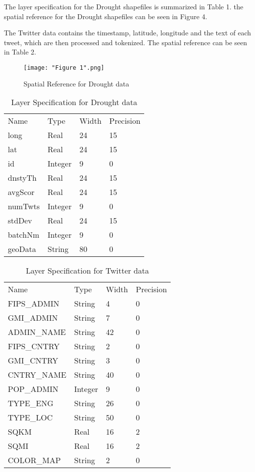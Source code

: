 \documentclass[conference]{IEEEtran}
\begin{document}
The layer specification for the Drought shapefiles is summarized in Table 1. the spatial reference for the Drought shapefiles can be seen in Figure 4.

The Twitter data contains the timestamp, latitude, longitude and the text of each tweet, which are then processed and tokenized. The spatial reference can be seen in Table 2.

\begin{figure}[ht]
\centerline{\texttt{[image: "Figure 1".png]}}
\caption{Spatial Reference for Drought data}
\label{Figure 4}
\end{figure}


\begin{table}[]
\caption{Layer Specification for Drought data}
\label{Table 1}
\centering
\begin{tabular}{llll}
Name    & Type    & Width & Precision \\
long    & Real    & 24    & 15        \\
lat     & Real    & 24    & 15        \\
id      & Integer & 9     & 0         \\
dnstyTh & Real    & 24    & 15        \\
avgScor & Real    & 24    & 15        \\
numTwts & Integer & 9     & 0         \\
stdDev  & Real    & 24    & 15        \\
batchNm & Integer & 9     & 0         \\
geoData & String  & 80    & 0        
\end{tabular}
\end{table}

\begin{table}[]
\caption{Layer Specification for Twitter data}
\label{Table 2}
\centering
\begin{tabular}{llll}
Name        & Type    & Width & Precision \\
FIPS\_ADMIN & String  & 4     & 0         \\
GMI\_ADMIN  & String  & 7     & 0         \\
ADMIN\_NAME & String  & 42    & 0         \\
FIPS\_CNTRY & String  & 2     & 0         \\
GMI\_CNTRY  & String  & 3     & 0         \\
CNTRY\_NAME & String  & 40    & 0         \\
POP\_ADMIN  & Integer & 9     & 0         \\
TYPE\_ENG   & String  & 26    & 0         \\
TYPE\_LOC   & String  & 50    & 0         \\
SQKM        & Real    & 16    & 2         \\
SQMI        & Real    & 16    & 2         \\
COLOR\_MAP  & String  & 2     & 0        
\end{tabular}
\end{table}
\end{document}
